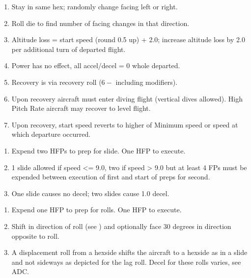 \begin{table*}
\begin{multicols}{2}
\begin{enumerate}[nosep]
    \item Stay in same hex; randomly change facing left or right.
    \item Roll die to find number of facing changes in that direction.
    \item Altitude loss = start speed (round 0.5 up) + 2.0; increase altitude loss by 2.0 per additional turn of departed flight.
    \item Power has no effect, all accel/decel = 0 whole departed.
    \item Recovery is via recovery roll ($6-$ including modifiers).
    \item Upon recovery aircraft must enter diving flight (vertical dives allowed). High Pitch Rate aircraft may recover to level flight.
    \item Upon recovery, start speed reverts to higher of Minimum speed or speed at which departure occurred.
\end{enumerate}



\begin{enumerate}[nosep]
    \item Expend two HFPs to prep for slide. One HFP to execute.
    \item 1 slide allowed if speed <= 9.0, two if speed > 9.0 but at least 4 FPs must be expended between execution of first and start of preps for second.
    \item One slide causes no decel; two slides cause 1.0 decel.
\end{enumerate}


\begin{enumerate}[nosep]
    \item Expend one HFP to prep for rolls. One HFP to execute.
    \item Shift in direction of roll (see ) and optionally face 30 degrees in direction opposite to roll.
    \item A displacement roll from a hexside shifts the aircraft to a hexside as in a slide and not sideways as depicted for the lag roll. Decel for these rolls varies, see ADC.
\end{enumerate}


\end{multicols}
\end{table*}
